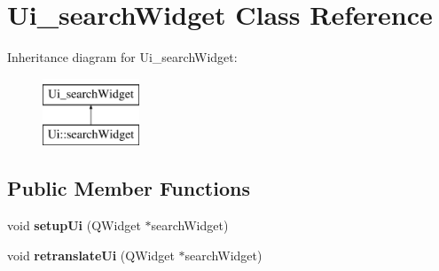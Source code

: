 \hypertarget{classUi__searchWidget}{\section{Ui\-\_\-search\-Widget Class Reference}
\label{classUi__searchWidget}
}
Inheritance diagram for Ui\-\_\-search\-Widget\-:\begin{figure}[H]
\begin{center}
\leavevmode
\includegraphics[height=2.000000cm]{d4/d9f/classUi__searchWidget}
\end{center}
\end{figure}
\subsection*{Public Member Functions}
\begin{DoxyCompactItemize}
\item 
\hypertarget{classUi__searchWidget_a2dc441f61ee3df9ca70a8e0bb9bc8a06}{void {\bfseries setup\-Ui} (Q\-Widget $\ast$search\-Widget)}\label{classUi__searchWidget_a2dc441f61ee3df9ca70a8e0bb9bc8a06}

\item 
\hypertarget{classUi__searchWidget_aed3733736853519d838b354650881338}{void {\bfseries retranslate\-Ui} (Q\-Widget $\ast$search\-Widget)}\label{classUi__searchWidget_aed3733736853519d838b354650881338}

\end{DoxyCompactItemize}
